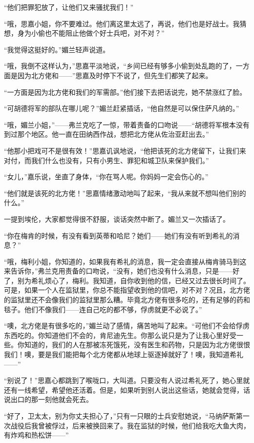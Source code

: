 \par “他们把罪犯放了，让他们又来骚扰我们！”
\par “哦，思嘉小姐，你不要难过。他们离这里太远了，再说，他们也是好战士。我猜想，身为小偷也不能阻止他做个好士兵吧，对不对？”
\par “我觉得这挺好的。”媚兰轻声说道。
\par “哦，我倒不这样认为，”思嘉平淡地说，“乡间已经有够多小偷到处乱跑的了，一方面是因为北方佬和——”思嘉及时停下不说了，但先生们都笑了起来。
\par “一方面是因为北方佬和我们的军需部。”他们接下去把话说完，她不禁涨红了脸。
\par “可胡德将军的部队在哪儿呢？”媚兰赶紧插话，“他自然是可以保住萨凡纳的。”
\par “哦，媚兰小姐，”——弗兰克吃了一惊，带着责备的口吻说——“胡德将军根本没有到过那个地区。他一直在田纳西作战，想把北方佬从佐治亚赶出去。”
\par “他那小把戏可不是很有效！”思嘉讥讽地说，“他把该死的北方佬留下，让我们来对付，而我们什么也没有，只有小男生、罪犯和城卫队来保护我们。”
\par “女儿，”嘉乐说，坐直了身体，“你在骂人呢。你妈妈一定会伤心的。”
\par “他们就是该死的北方佬！”思嘉情绪激动地叫了起来，“我从来就不想叫他们别的什么。”
\par 一提到埃伦，大家都觉得很不舒服，谈话突然中断了。媚兰又一次插话了。
\par “你在梅肯的时候，有没有看到英蒂和哈尼？她们——她们有没有听到希礼的消息？”
\par “哦，梅利小姐，你知道的，如果我有希礼的消息，我一定会直接从梅肯骑马到这来告诉你，”弗兰克用责备的口吻说，“没有，她们也没有什么消息，只是——好了，别为希礼烦心了，梅利。我知道，自你收到他的信，已经又过去很长时间了。可是，如果一个人在监狱里，你总不能指望收到他的信吧，对不对？况且，北方佬的监狱里还不会像我们的监狱里那么糟。毕竟北方佬有很多吃的，还有足够的药和毯子。他们不像我们——连自己吃的都不够，俘虏就更不必说了。”
\par “噢，北方佬是有很多吃的，”媚兰动了感情，痛苦地叫了起来。“可他们不会给俘虏东西吃的。你知道他们不会的，肯尼迪先生。你那么说只是为了让我心里好受一些。你知道的，我们的人在那被冻死饿死，没有医生和药物，只是因为北方佬很恨我们！噢，要是我们能把每个北方佬都从地球上驱逐掉就好了！噢，我知道希礼——”
\par “别说了！”思嘉心都跳到了喉咙口，大叫道。只要没有人说过希礼死了，她心里就还有一线希望，希望他还活着。但是，如果听到别人说出这些话，她就会觉得，话说出口的那一刻他就会死去。
\par “好了，卫太太，别为你丈夫担心了，”只有一只眼的士兵安慰她说，“马纳萨斯第一次战役后我曾被俘过，后来被换回来了。我在监狱的时候，他们给我吃大鱼大肉，有炸鸡和热松饼——”
